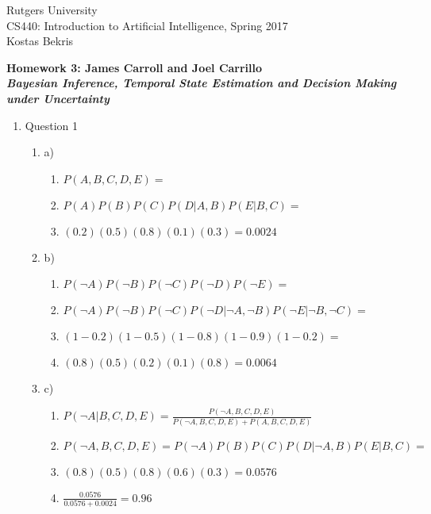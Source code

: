 \documentclass[11pt]{article}
\begin{document}
\sloppy

\noindent Rutgers University\\
CS440: Introduction to Artificial Intelligence, Spring 2017\\
Kostas Bekris\\

\begin{center}
\LARGE{\textbf{Homework 3: James Carroll and Joel Carrillo}}\\
\large{\textbf{\emph{Bayesian Inference, Temporal State Estimation and Decision Making under Uncertainty}}}
\end{center}

\vspace{.1in}

\begin{enumerate}

\item Question 1
\begin{enumerate}

\item a) 
\begin{enumerate}
\item $P(A, B, C, D, E) =$
\item $P(A)P(B)P(C)P(D|A,B)P(E|B,C) =$
\item $(0.2)(0.5)(0.8)(0.1)(0.3) = 0.0024$
\end{enumerate}

\item b) 
\begin{enumerate}
\item $P(\neg A)P(\neg B)P(\neg C)P(\neg D)P(\neg E) =$ 
\item $P(\neg A)P(\neg B)P(\neg C)P(\neg D|\neg A, \neg B)P(\neg E|\neg B, \neg C) =$
\item $(1 - 0.2)(1 - 0.5)(1 - 0.8)(1 - 0.9)(1 - 0.2) =$ 
\item $(0.8)(0.5)(0.2)(0.1)(0.8) = 0.0064$
\end{enumerate}

\item c) 
\begin{enumerate}
\item $P(\neg A | B, C, D, E) =\frac{P(\neg A, B, C, D, E)}{P(\neg A, B, C, D, E) + P(A, B, C, D, E)}$ 
\item  $P(\neg A, B, C, D, E) = P(\neg A)P(B)P(C)P(D |\neg A, B)P(E | B, C) = $ \item $(0.8)(0.5)(0.8)(0.6)(0.3) = 0.0576$ 
\item $\frac{0.0576}{0.0576+0.0024} = 0.96$
\end{enumerate}


\end{enumerate}
\end{enumerate}
\end{document}
